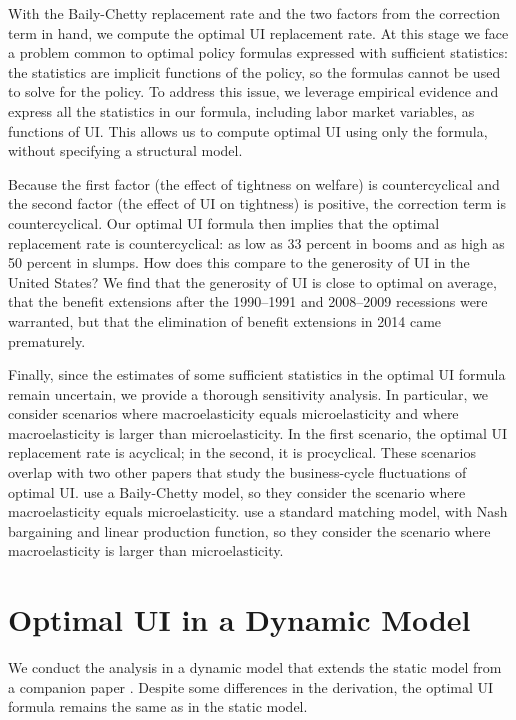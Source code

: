 \documentclass[letterpaper,12pt,leqno]{article}
\begin{document}
With the Baily-Chetty replacement rate and the two factors from the correction term in hand, we compute the optimal UI replacement rate. At this stage we face a problem common to optimal policy formulas expressed with sufficient statistics: the statistics are implicit functions of the policy, so the formulas cannot be used to solve for the policy. To address this issue, we leverage empirical evidence and express all the statistics in our formula, including labor market variables, as functions of UI. This allows us to compute optimal UI using only the formula, without specifying a structural model.

Because the first factor (the effect of tightness on welfare) is countercyclical and the second factor (the effect of UI on tightness) is positive, the correction term is countercyclical.  Our optimal UI formula then implies that the optimal replacement rate is countercyclical: as low as 33 percent in booms and as high as 50 percent in slumps. How does this compare to the generosity of UI in the United States? We find that the generosity of UI is close to optimal on average, that the benefit extensions after the 1990--1991 and 2008--2009 recessions were warranted, but that the elimination of benefit extensions in 2014 came prematurely.


Finally, since the estimates of some sufficient statistics in the optimal UI formula remain uncertain, we provide a thorough sensitivity analysis. In particular, we consider scenarios where macroelasticity equals microelasticity and where macroelasticity is larger than microelasticity. In the first scenario, the optimal UI replacement rate is acyclical; in the second, it is procyclical. These scenarios overlap with two other papers that study the business-cycle fluctuations of optimal UI. \citet{KN10} use a Baily-Chetty model, so they consider the scenario where macroelasticity equals microelasticity. \citet{MR11} use a standard matching model, with Nash bargaining and linear production function, so they consider the scenario where macroelasticity is larger than microelasticity.

\section{Optimal UI in a Dynamic Model}\label{sec:model}

We conduct the analysis in a dynamic model that extends the static model from a companion paper \citep{LMS10}. Despite some differences in the derivation, the optimal UI formula remains the same as in the static model.
\end{document}
